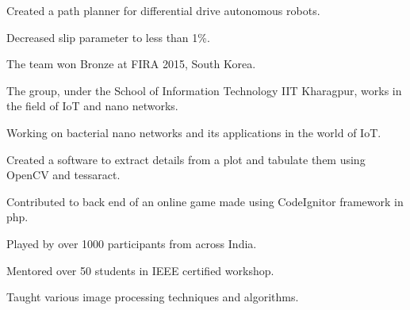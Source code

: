 \documentclass[a4paper]{deedy-resume} %
\begin{document}
\begin{minipage}[t]{0.66\textwidth}
  \sectionspace

  \runsubsection{}
  \begin{tightitemize}
  \item Created a path planner for differential drive autonomous robots.
  \item	Decreased slip parameter to less than 1\%.
  \item The team won Bronze at FIRA 2015, South Korea.
  \end{tightitemize}

  \sectionspace
  
  \runsubsection{}
  \begin{tightitemize}
  \item The group, under the School of Information Technology IIT Kharagpur, works in the field of IoT and nano networks.
  \item	Working on bacterial nano networks and its applications in the world of IoT.
  \end{tightitemize}

  \sectionspace

  \runsubsection{}
  \begin{tightitemize}
  \item Created a software to extract details from a plot and tabulate them using OpenCV and tessaract.
  \end{tightitemize}

  \sectionspace

  \runsubsection{}
  \begin{tightitemize}
  \item Contributed to back end of an online game made using CodeIgnitor framework in php.
  \item Played by over 1000 participants from across India.
  \end{tightitemize}


  \sectionspace

  \runsubsection{}
  \begin{tightitemize}
  \item Mentored over 50 students in IEEE certified workshop.
  \item Taught various image processing techniques and algorithms.
  \end{tightitemize}


\end{minipage}
\end{document}
